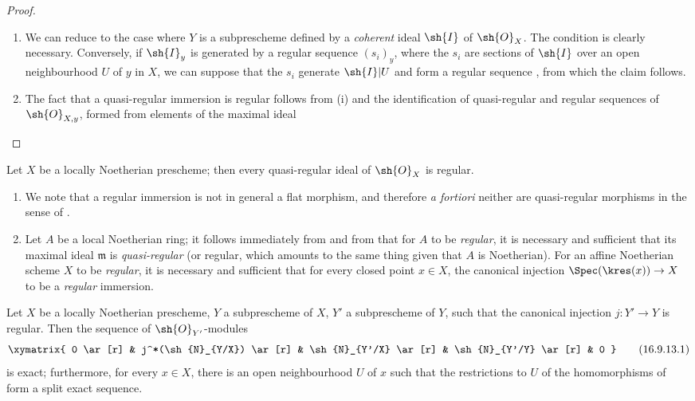 \begin{proof}
  \begin{enumerate}
    \item[\rm{(i)}] We can reduce to the case where $Y$ is a subprescheme defined by a \emph{coherent} ideal $\sh{I}$ of $\sh{O}_X$.
    The condition is clearly necessary.
    Conversely, if $\sh{I}_y$ is generated by a regular sequence $(s_i)_y$, where the $s_i$ are sections of $\sh{I}$ over an open neighbourhood $U$ of $y$ in $X$, we can suppose that the $s_i$ generate $\sh{I}|U$  and form a regular sequence , from which the claim follows.
    \item[\rm{(ii)}] The fact that a quasi-regular immersion is regular follows from (i) and the identification of quasi-regular and regular sequences of $\sh{O}_{X,y}$, formed from elements of the maximal ideal 
  \end{enumerate}
\end{proof}

\begin{corollary}[16.9.11]
\label{IV.16.9.11}
Let $X$ be a locally Noetherian prescheme;
then every quasi-regular ideal of $\sh{O}_X$ is regular.
\end{corollary}

\begin{remarks}[16.9.12]
\label{IV.16.9.12}
\begin{enumerate}
  \item[\rm{(i)}] We note that a regular immersion is not in general a flat morphism, and therefore \textit{a fortiori} neither are quasi-regular morphisms in the sense of .
  \item[\rm{(ii)}] Let $A$ be a local Noetherian ring;
  it follows immediately from  and from  that for $A$ to be \emph{regular}, it is necessary and sufficient that its maximal ideal $\mathfrak{m}$ is \emph{quasi-regular} (or regular, which amounts to the same thing  given that $A$ is Noetherian).
  For an affine Noetherian scheme $X$ to be \emph{regular}, it is necessary and sufficient that for every closed point $x \in X$, the canonical injection $\Spec(\kres(x)) \to X$ to be a \emph{regular} immersion.
\end{enumerate}
\end{remarks}

\begin{proposition}[16.9.13]
\label{IV.16.9.13}
Let $X$ be a locally Noetherian prescheme, $Y$ a subprescheme of $X$, $Y'$ a subprescheme of $Y$, such that the canonical injection $j:Y' \to Y$ is regular. 
Then the sequence of $\sh{O}_{Y'}$-modules
\[
  \label{IV.16.9.13.1}
  \xymatrix{
    0 \ar[r] & j^*(\sh{N}_{Y/X}) \ar[r] & \sh{N}_{Y'/X} \ar[r] & \sh{N}_{Y'/Y} \ar[r] & 0
  }
  \tag{16.9.13.1}
\]
is exact;
furthermore, for every $x \in X$, there is an open neighbourhood $U$ of $x$ such that the restrictions to $U$ of the homomorphisms of  form a split exact sequence.
\end{proposition}

